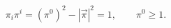 \begin{equation} \label{Homo1}
\pi_i \pi^i = (\pi^0)^2 - |\vec\pi|^2 = 1, \qquad \pi^0 \geq 1.
\end{equation}

